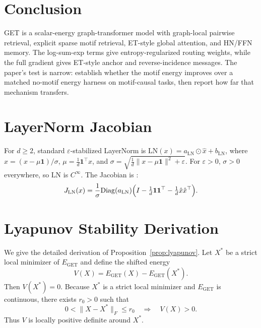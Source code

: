 \documentclass[11pt,a4paper]{article}
\begin{document}
\section{Conclusion}

GET is a scalar-energy graph-transformer model with graph-local pairwise
retrieval, explicit sparse motif retrieval, ET-style global attention, and
HN/FFN memory. The log-sum-exp terms give entropy-regularized routing weights,
while the full gradient gives ET-style anchor and reverse-incidence messages.
The paper's test is narrow: establish whether the motif energy improves over a
matched no-motif energy harness on motif-causal tasks, then report how far that
mechanism transfers.

\appendix
\section{LayerNorm Jacobian}
\label{app:layernorm}

For $d\ge2$, standard $\varepsilon$-stabilized LayerNorm is
$\mathrm{LN}(x) = a_{\mathrm{LN}} \odot \hat{x} + b_{\mathrm{LN}}$, where
$\hat{x} = (x - \mu\mathbf{1})/\sigma$,
$\mu = \frac{1}{d}\mathbf{1}^\top x$, and
$\sigma = \sqrt{\frac{1}{d}\|x - \mu\mathbf{1}\|^2 + \varepsilon}$.
For $\varepsilon > 0$, $\sigma > 0$ everywhere, so $\mathrm{LN}$ is
$C^\infty$. The Jacobian is \citep{ba2016layer}:
\begin{equation}
  J_{\mathrm{LN}}(x)
  = \frac{1}{\sigma}\mathrm{Diag}(a_{\mathrm{LN}})
    \Bigl(I - \tfrac{1}{d}\mathbf{1}\mathbf{1}^\top
           - \tfrac{1}{d}\hat{x}\hat{x}^\top\Bigr).
\end{equation}

\section{Lyapunov Stability Derivation}
\label{app:lyapunov}

We give the detailed derivation of Proposition~\ref{prop:lyapunov}. Let
$X^*$ be a strict local minimizer of $E_{\mathrm{GET}}$ and define the shifted
energy
\begin{equation}
  V(X) = E_{\mathrm{GET}}(X) - E_{\mathrm{GET}}(X^*).
\end{equation}
Then $V(X^*)=0$. Because $X^*$ is a strict local minimizer and
$E_{\mathrm{GET}}$ is continuous, there exists $r_0>0$ such that
\begin{equation}
  0 < \|X-X^*\|_F \le r_0
  \quad\Longrightarrow\quad
  V(X) > 0.
  \label{eq:lyapunov-local-positive}
\end{equation}
Thus $V$ is locally positive definite around $X^*$.
\end{document}
